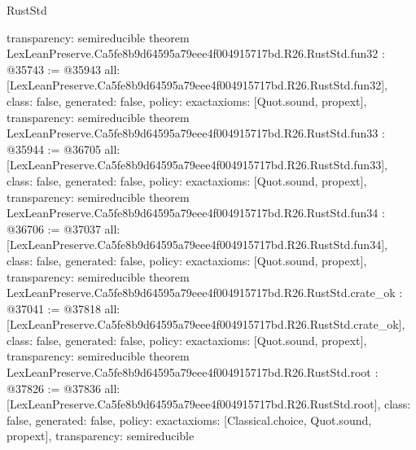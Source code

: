 \begin{lexlean}{RustStd}
\begin{coremodule}
{  transparency: semireducible
}
theorem LexLeanPreserve.Ca5fe8b9d64595a79eee4f004915717bd.R26.RustStd.fun32 : @35743 := @35943 {
  all: [LexLeanPreserve.Ca5fe8b9d64595a79eee4f004915717bd.R26.RustStd.fun32],
  class: false,
  generated: false,
  policy: exact{axioms: [Quot.sound, propext]},
  transparency: semireducible
}
theorem LexLeanPreserve.Ca5fe8b9d64595a79eee4f004915717bd.R26.RustStd.fun33 : @35944 := @36705 {
  all: [LexLeanPreserve.Ca5fe8b9d64595a79eee4f004915717bd.R26.RustStd.fun33],
  class: false,
  generated: false,
  policy: exact{axioms: [Quot.sound, propext]},
  transparency: semireducible
}
theorem LexLeanPreserve.Ca5fe8b9d64595a79eee4f004915717bd.R26.RustStd.fun34 : @36706 := @37037 {
  all: [LexLeanPreserve.Ca5fe8b9d64595a79eee4f004915717bd.R26.RustStd.fun34],
  class: false,
  generated: false,
  policy: exact{axioms: [Quot.sound, propext]},
  transparency: semireducible
}
theorem LexLeanPreserve.Ca5fe8b9d64595a79eee4f004915717bd.R26.RustStd.crate_ok : @37041 := @37818 {
  all: [LexLeanPreserve.Ca5fe8b9d64595a79eee4f004915717bd.R26.RustStd.crate_ok],
  class: false,
  generated: false,
  policy: exact{axioms: [Quot.sound, propext]},
  transparency: semireducible
}
theorem LexLeanPreserve.Ca5fe8b9d64595a79eee4f004915717bd.R26.RustStd.root : @37826 := @37836 {
  all: [LexLeanPreserve.Ca5fe8b9d64595a79eee4f004915717bd.R26.RustStd.root],
  class: false,
  generated: false,
  policy: exact{axioms: [Classical.choice, Quot.sound, propext]},
  transparency: semireducible
}


\end{coremodule}
\end{lexlean}

